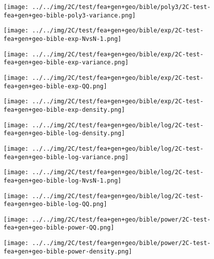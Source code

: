 \begin{figure}[H]
\centering	\texttt{[image: ../../img/2C/test/fea+gen+geo/bible/poly3/2C-test-fea+gen+geo-bible-poly3-variance.png]}
\end{figure}
\begin{figure}[H]
\centering	\texttt{[image: ../../img/2C/test/fea+gen+geo/bible/exp/2C-test-fea+gen+geo-bible-exp-NvsN-1.png]}
\end{figure}
\begin{figure}[H]
\centering	\texttt{[image: ../../img/2C/test/fea+gen+geo/bible/exp/2C-test-fea+gen+geo-bible-exp-variance.png]}
\end{figure}
\begin{figure}[H]
\centering	\texttt{[image: ../../img/2C/test/fea+gen+geo/bible/exp/2C-test-fea+gen+geo-bible-exp-QQ.png]}
\end{figure}
\begin{figure}[H]
\centering	\texttt{[image: ../../img/2C/test/fea+gen+geo/bible/exp/2C-test-fea+gen+geo-bible-exp-density.png]}
\end{figure}
\begin{figure}[H]
\centering	\texttt{[image: ../../img/2C/test/fea+gen+geo/bible/log/2C-test-fea+gen+geo-bible-log-density.png]}
\end{figure}
\begin{figure}[H]
\centering	\texttt{[image: ../../img/2C/test/fea+gen+geo/bible/log/2C-test-fea+gen+geo-bible-log-variance.png]}
\end{figure}
\begin{figure}[H]
\centering	\texttt{[image: ../../img/2C/test/fea+gen+geo/bible/log/2C-test-fea+gen+geo-bible-log-NvsN-1.png]}
\end{figure}
\begin{figure}[H]
\centering	\texttt{[image: ../../img/2C/test/fea+gen+geo/bible/log/2C-test-fea+gen+geo-bible-log-QQ.png]}
\end{figure}
\begin{figure}[H]
\centering	\texttt{[image: ../../img/2C/test/fea+gen+geo/bible/power/2C-test-fea+gen+geo-bible-power-QQ.png]}
\end{figure}
\begin{figure}[H]
\centering	\texttt{[image: ../../img/2C/test/fea+gen+geo/bible/power/2C-test-fea+gen+geo-bible-power-density.png]}
\end{figure}
